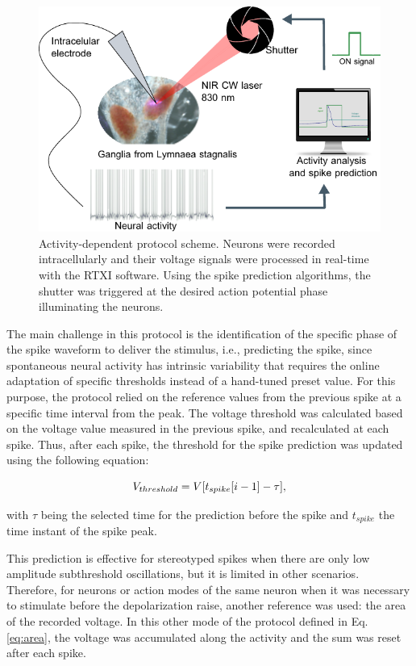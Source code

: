 \begin{figure}[htb!]
	\includegraphics[width=\textwidth]{img/laser/activity_dependent_protocol.pdf}
	\caption{Activity-dependent protocol scheme. Neurons were recorded intracellularly and their voltage signals were processed in real-time with the RTXI software. Using the spike prediction algorithms, the shutter was triggered at the desired action potential phase illuminating the neurons.}
	\label{fig:activity dependent protocol}
\end{figure}


The main challenge in this protocol is the identification of the specific phase of the spike waveform to deliver the stimulus, i.e., predicting the spike, since spontaneous neural activity has intrinsic variability that requires the online adaptation of specific thresholds instead of a hand-tuned preset value. For this purpose, the protocol relied on the reference values from the previous spike at a specific time interval from the peak. The voltage threshold was calculated based on the voltage value measured in the previous spike, and recalculated at each spike. Thus, after each spike, the threshold for the spike prediction was updated using the following equation:

\begin{equation}
	\centering 
	V_{threshold}=V[t_{spike}[i-1]-\tau],
\end{equation}

\noindent with $\tau$ being the selected time for the prediction before the spike and $t_{spike}$ the time instant of the spike peak.

This prediction is effective for stereotyped spikes when there are only low amplitude subthreshold oscillations, but it is limited in other scenarios. Therefore, for neurons or action modes of the same neuron when it was necessary to stimulate before the depolarization raise, another reference was used: the area of the recorded voltage. In this other mode of the protocol defined in Eq. \ref{eq:area}, the voltage was accumulated along the activity and the sum was reset after each spike. 

